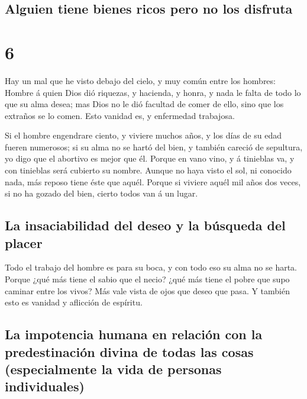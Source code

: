 \hypertarget{alguien-tiene-bienes-ricos-pero-no-los-disfruta}{%
\subsection{Alguien tiene bienes ricos pero no los
disfruta}\label{alguien-tiene-bienes-ricos-pero-no-los-disfruta}}

\hypertarget{section-21-6}{%
\section{6}\label{section-21-6}}

 Hay un mal que he visto debajo del cielo, y muy común
entre los hombres:  Hombre á quien Dios dió riquezas, y
hacienda, y honra, y nada le falta de todo lo que su alma desea; mas
Dios no le dió facultad de comer de ello, sino que los extraños se lo
comen. Esto vanidad es, y enfermedad trabajosa.

 Si el hombre engendrare ciento, y viviere muchos años, y
los días de su edad fueren numerosos; si su alma no se hartó del bien, y
también careció de sepultura, yo digo que el abortivo es mejor que él.
 Porque en vano vino, y á tinieblas va, y con tinieblas
será cubierto su nombre.  Aunque no haya visto el sol, ni
conocido nada, más reposo tiene éste que aquél.  Porque si
viviere aquél mil años dos veces, si no ha gozado del bien, cierto todos
van á un lugar.

\hypertarget{la-insaciabilidad-del-deseo-y-la-buxfasqueda-del-placer}{%
\subsection{La insaciabilidad del deseo y la búsqueda del
placer}\label{la-insaciabilidad-del-deseo-y-la-buxfasqueda-del-placer}}

 Todo el trabajo del hombre es para su boca, y con todo
eso su alma no se harta.  Porque ¿qué más tiene el sabio
que el necio? ¿qué más tiene el pobre que supo caminar entre los vivos?
 Más vale vista de ojos que deseo que pasa. Y también esto
es vanidad y aflicción de espíritu.

\hypertarget{la-impotencia-humana-en-relaciuxf3n-con-la-predestinaciuxf3n-divina-de-todas-las-cosas-especialmente-la-vida-de-personas-individuales}{%
\subsection{La impotencia humana en relación con la predestinación
divina de todas las cosas (especialmente la vida de personas
individuales)}\label{la-impotencia-humana-en-relaciuxf3n-con-la-predestinaciuxf3n-divina-de-todas-las-cosas-especialmente-la-vida-de-personas-individuales}}

